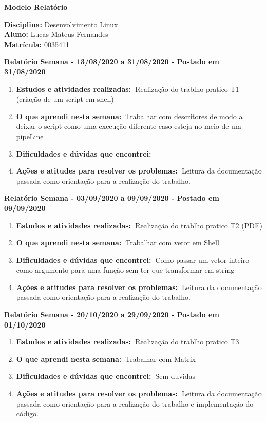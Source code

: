 \documentclass[10pt,a4paper]{report}
\newcommand{\bola}{\resizebox{12pt}{!}{$\bullet$\ }}
\newcommand{\relatorio}[3]{\vspace{3mm}\noindent\bola\textbf{Relatório Semana - #1 a #2 - Postado em #3}}
\newcommand{\atividades}{\textbf{Estudos e atividades realizadas:\ }}
\newcommand{\aprendizado}{\textbf{O que aprendi nesta semana:\ }}
\newcommand{\duvidas}{\textbf{Dificuldades e dúvidas que encontrei:\ }}
\newcommand{\acoes}{\textbf{Ações e atitudes para resolver os problemas:\ }}
\begin{document}
\begin{center} \LARGE
   \textbf{Modelo Relatório} \\[10mm]
\end{center}

\bgroup \large 
\noindent
\textbf{Disciplina:} Desenvolvimento Linux \\
\textbf{Aluno:} Lucas Mateus Fernandes\\
\textbf{Matrícula:} 0035411\\[5mm]
\egroup

\relatorio{13/08/2020}{31/08/2020}{31/08/2020}
\begin{enumerate}
	\item \atividades Realização do trablho pratico T1 (criação de um script em shell)
	
	\item \aprendizado Trabalhar com descritores de modo a deixar o script como uma execução diferente caso esteja no meio de um pipeLine
	
	\item \duvidas ----
	
	\item \acoes Leitura da documentação passada como orientação para a realização do trabalho.
\end{enumerate}


\relatorio{03/09/2020}{09/09/2020}{09/09/2020}
\begin{enumerate}
	\item \atividades Realização do trablho pratico T2 (PDE)
	
	\item \aprendizado Trabalhar com vetor em Shell
	
	\item \duvidas Como passar um vetor inteiro como argumento para uma função sem ter que transformar em string
	
	\item \acoes Leitura da documentação passada como orientação para a realização do trabalho.
\end{enumerate}


\relatorio{20/10/2020}{29/09/2020}{01/10/2020}
\begin{enumerate}
	\item \atividades Realização do trablho pratico T3 
	
	\item \aprendizado Trabalhar com Matrix
	
	\item \duvidas Sem duvidas
	
	\item \acoes Leitura da documentação passada como orientação para a realização do trabalho e implementação do código.
\end{enumerate}
\end{document}
